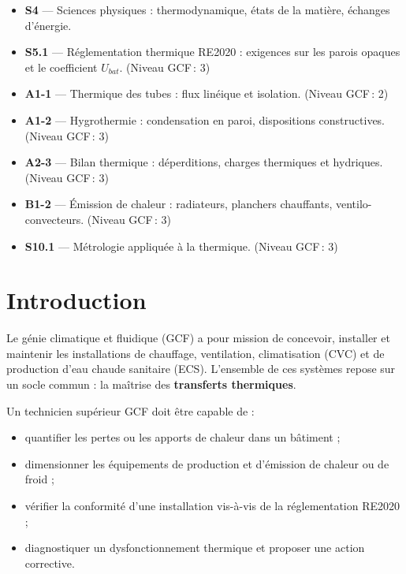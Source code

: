 \begin{itemize}
  \item \textbf{S4} — Sciences physiques : thermodynamique, états de la matière, échanges
        d'énergie.
  \item \textbf{S5.1} — Réglementation thermique RE2020 : exigences sur les parois opaques
        et le coefficient \(U_{bat}\). (Niveau GCF\,: 3)
  \item \textbf{A1-1} — Thermique des tubes : flux linéique et isolation. (Niveau GCF\,: 2)
  \item \textbf{A1-2} — Hygrothermie : condensation en paroi, dispositions constructives.
        (Niveau GCF\,: 3)
  \item \textbf{A2-3} — Bilan thermique : déperditions, charges thermiques et hydriques.
        (Niveau GCF\,: 3)
  \item \textbf{B1-2} — Émission de chaleur : radiateurs, planchers chauffants,
        ventilo-convecteurs. (Niveau GCF\,: 3)
  \item \textbf{S10.1} — Métrologie appliquée à la thermique. (Niveau GCF\,: 3)
\end{itemize}

\section{Introduction}

Le génie climatique et fluidique (GCF) a pour mission de concevoir, installer et maintenir les
installations de chauffage, ventilation, climatisation (CVC) et de production d'eau chaude
sanitaire (ECS). L'ensemble de ces systèmes repose sur un socle commun : la maîtrise des
\textbf{transferts thermiques}.

Un technicien supérieur GCF doit être capable de :
\begin{itemize}
  \item quantifier les pertes ou les apports de chaleur dans un bâtiment ;
  \item dimensionner les équipements de production et d'émission de chaleur ou de froid ;
  \item vérifier la conformité d'une installation vis-à-vis de la réglementation RE2020 ;
  \item diagnostiquer un dysfonctionnement thermique et proposer une action corrective.
\end{itemize}

